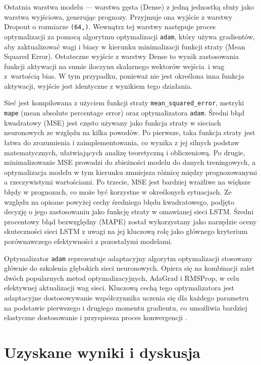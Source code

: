 \documentclass[polish, twoside, 12pt, a4paper]{article}
\theoremstyle{definition}
\theoremstyle{plain}
\theoremstyle{remark}
\newcommand{\code}[1]{\lstinline{#1}}
\begin{document}
Ostatnia warstwa modelu --- warstwa gęsta (Dense) z jedną jednostką służy jako warstwa wyjściowa, generując prognozy. Przyjmuje ona wyjście z warstwy Dropout o rozmiarze \code{(64,)}. Wewnątrz tej warstwy następuje proces optymalizacji za pomocą algorytmu optymalizacji \code{adam}, który używa gradientów, aby zaktualizować wagi i biasy w kierunku minimalizacji funkcji straty (Mean Squared Error). Ostateczne wyjście z warstwy Dense to wynik zastosowania funkcji aktywacji na sumie iloczynu skalarnego wektorów wejścia i wag z wartością bias. W tym przypadku, ponieważ nie jest określona inna funkcja aktywacji, wyjście jest identyczne z wynikiem tego działania.

Sieć jest kompilowana z użyciem funkcji straty \code{mean_squared_error}, metryki \code{mape} (mean absolute percentage error) oraz optymalizatora \code{adam}. Średni błąd kwadratowy (MSE) jest często używany jako funkcja straty w sieciach neuronowych ze względu na kilka powodów. Po pierwsze, taka funkcja straty jest łatwa do zrozumienia i zaimplementowania, co wynika z jej silnych podstaw matematycznych, ułatwiających analizę teoretyczną i obliczeniową. Po drugie, minimalizowanie MSE prowadzi do zbieżności modelu do danych treningowych, a optymalizacja modelu w tym kierunku zmniejsza różnicę między prognozowanymi a rzeczywistymi wartościami. Po trzecie, MSE jest bardziej wrażliwe na większe błędy w prognozach, co może być korzystne w określonych sytuacjach. Ze względu na opisane powyżej cechy średniego błędu kwadratowego, podjęto decyzję o jego zastosowaniu jako funkcję straty w omawianej sieci LSTM. Średni procentowy błąd bezwzględny (MAPE) został wykorzystany jako narzędzie oceny skuteczności sieci LSTM z uwagi na jej kluczową rolę jako głównego kryterium porównawczego efektywności z pozostałymi modelami.

Optymalizator \code{adam} reprezentuje adaptacyjny algorytm optymalizacji stosowany głównie do szkolenia głębokich sieci neuronowych. Opiera się na kombinacji zalet dwóch popularnych metod optymalizacyjnych, AdaGrad i RMSProp, w celu efektywnej aktualizacji wag sieci. Kluczową cechą tego optymalizatora jest adaptacyjne dostosowywanie współczynnika uczenia się dla każdego parametru na podstawie pierwszego i drugiego momentu gradientu, co umożliwia bardziej elastyczne dostosowanie i przyspiesza proces konwergencji \parencite{frackiewicz2023}.


\clearpage
\section{Uzyskane wyniki i dyskusja}\label{sec:wyniki}
\end{document}
